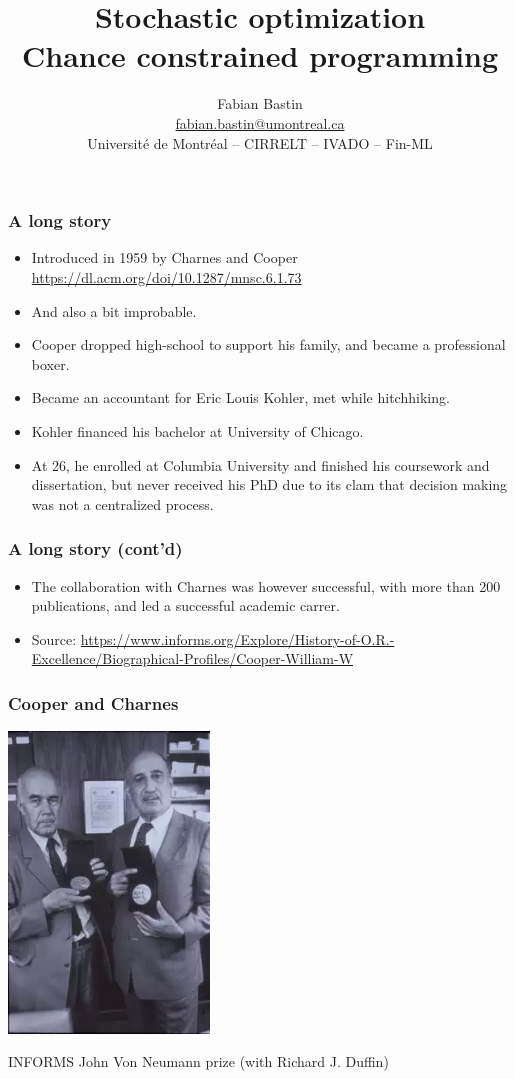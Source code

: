 \documentclass{beamer}
\title[CP]{Stochastic optimization\\Chance constrained programming}
\author[Fabian Bastin]{Fabian Bastin \\ \url{fabian.bastin@umontreal.ca} \\ Université de Montréal -- CIRRELT -- IVADO -- Fin-ML}
\date{}
\begin{document}

\frame{\titlepage}

\begin{frame}
\frametitle{A long story}

\begin{itemize}
	\item 
Introduced in 1959 by Charnes and Cooper \url{https://dl.acm.org/doi/10.1287/mnsc.6.1.73}
	\item 
And also a bit improbable.
	\item 
Cooper dropped high-school to support his family, and became a professional boxer.
	\item 
Became an accountant for Eric Louis Kohler, met while hitchhiking.
	\item 
Kohler financed his bachelor at University of Chicago.
\item
At 26, he enrolled at Columbia University and finished his coursework and dissertation, but never received his PhD due to its clam that decision making was not a centralized process.
\end{itemize}

\end{frame}

\begin{frame}
\frametitle{A long story (cont'd)}
	
\begin{itemize}
\item
The collaboration with Charnes was however successful, with more than 200 publications, and led a successful academic carrer.
\item 
Source: \url{https://www.informs.org/Explore/History-of-O.R.-Excellence/Biographical-Profiles/Cooper-William-W}
\end{itemize}

\end{frame}

\begin{frame}[fragile]
\frametitle{Cooper and Charnes}

\begin{center}
\includegraphics[width=0.4\textwidth]{imgs/coopercharnes.png}

INFORMS John Von Neumann prize (with Richard J. Duffin)
\end{center}

\end{frame}
\end{document}
